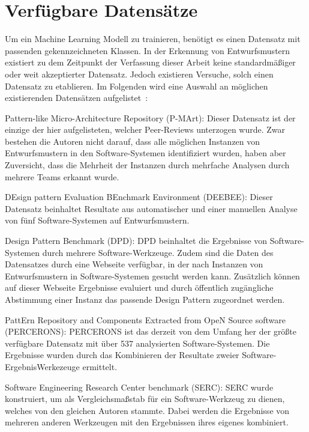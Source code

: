 \section{Verfügbare Datensätze}\label{dataset}
Um ein Machine Learning Modell zu trainieren, benötigt es einen Datensatz mit passenden gekennzeichneten Klassen.
In der Erkennung von Entwurfsmustern existiert zu dem Zeitpunkt der Verfassung dieser Arbeit keine standardmäßiger oder weit akzeptierter Datensatz.
Jedoch existieren Versuche, solch einen Datensatz zu etablieren. Im Folgenden wird eine Auswahl an möglichen existierenden Datensätzen aufgelistet~\cite[S. 104 - 105]{phdthesis}:

\begin{description}
    \item Pattern-like Micro-Architecture Repository (P-MArt): Dieser Datensatz ist der einzige der hier aufgelisteten, welcher Peer-Reviews unterzogen wurde. Zwar bestehen die Autoren nicht darauf, dass alle möglichen Instanzen von Entwurfsmustern in den Software-Systemen identifiziert wurden, haben aber Zuversicht, dass die Mehrheit der Instanzen durch mehrfache Analysen durch mehrere Teams erkannt wurde. 
    \item DEsign pattern Evaluation BEnchmark Environment (DEEBEE): Dieser Datensatz beinhaltet Resultate aus automatischer und einer manuellen Analyse von fünf Software-Systemen auf Entwurfsmustern.
    \item Design Pattern Benchmark (DPD): DPD beinhaltet die Ergebnisse von Software-Systemen durch mehrere Software-Werkzeuge. Zudem sind die Daten des Datensatzes durch eine Webseite verfügbar, in der nach Instanzen von Entwurfsmustern in Software-Systemen gesucht werden kann. Zusätzlich können auf dieser Webseite Ergebnisse evaluiert und durch öffentlich zugängliche Abstimmung einer Instanz das passende Design Pattern zugeordnet werden.
    \item PattErn Repository and Components Extracted from OpeN Source software (PERCERONS): PERCERONS ist das derzeit von dem Umfang her der größte verfügbare Datensatz mit über 537 analysierten Software-Systemen. Die Ergebnisse wurden durch das Kombinieren der Resultate zweier Software-ErgebnisWerkezeuge ermittelt.
    \item Software Engineering Research Center benchmark (SERC): SERC wurde konstruiert, um als Vergleichsmaßstab für ein Software-Werkzeug zu dienen, welches von den gleichen Autoren stammte. Dabei werden die Ergebnisse von mehreren anderen Werkzeugen mit den Ergebnissen ihres eigenes kombiniert.
\end{description}

